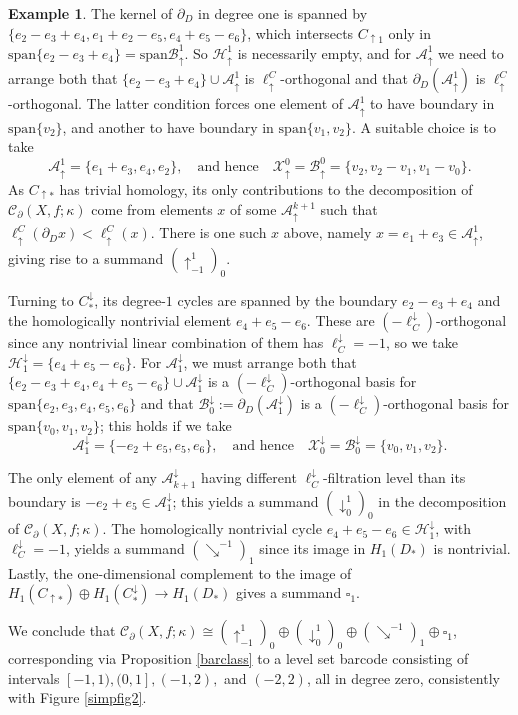 \documentclass[11pt]{amsart}
\theoremstyle{definition}
\newtheorem{ex}[theorem]{Example}
\theoremstyle{remark}
\numberwithin{equation}{section}
\begin{document}
\begin{ex}
	The kernel of $\partial_D$ in degree one is spanned by $\{e_2-e_3+e_4,e_1+e_2-e_5, e_4+e_5-e_6\}$, which intersects $C_{\uparrow 1}$ only in $\mathrm{span}\{e_2-e_3+e_4\}=\mathrm{span}\mathcal{B}_{\uparrow}^{1}$.  So $\mathcal{H}_{\uparrow}^{1}$ is necessarily empty, and for $\mathcal{A}_{\uparrow}^{1}$ we need to arrange both that $\{e_2-e_3+e_4\}\cup \mathcal{A}_{\uparrow}^{1}$ is $\ell_{\uparrow}^{C}$-orthogonal and that $\partial_D(\mathcal{A}_{\uparrow}^{1})$ is  $\ell_{\uparrow}^{C}$-orthogonal.  The latter condition forces one element of $\mathcal{A}_{\uparrow}^{1}$ to have boundary in $\mathrm{span}\{v_2\}$, and another to have boundary in $\mathrm{span}\{v_1,v_2\}$.  A suitable choice is to take \[ \mathcal{A}_{\uparrow}^{1}=\{e_1+e_3,e_4,e_2\},\quad\mbox{and hence}\quad \mathcal{X}_{\uparrow}^{0}=\mathcal{B}_{\uparrow}^{0}=\{v_2,v_2-v_1,v_1-v_0\}.\]	As $C_{\uparrow *}$ has trivial homology, its only contributions to the decomposition of $\mathcal{C}_{\partial}(X,f;\kappa)$ come from elements $x$ of some $\mathcal{A}_{\uparrow}^{k+1}$ such that $\ell_{\uparrow}^{C}(\partial_Dx)<\ell_{\uparrow}^{C}(x)$.  There is one such $x$ above, namely $x=e_1+e_3\in \mathcal{A}_{\uparrow}^{1}$, giving rise to a summand $(\uparrow_{-1}^{1})_0$.
	
	Turning to $C^{\downarrow}_{*}$, its degree-$1$ cycles are spanned by the boundary $e_2-e_3+e_4$ and the homologically nontrivial element $e_4+e_5-e_6$. These are $(-\ell^{\downarrow}_C)$-orthogonal since any nontrivial linear combination of them has $\ell^{\downarrow}_{C}=-1$, so we take $\mathcal{H}^{\downarrow}_{1}=\{e_4+e_5-e_6\}$. For $\mathcal{A}^{\downarrow}_{1}$, we must arrange both that $\{e_2-e_3+e_4,e_4+e_5-e_6\}\cup\mathcal{A}^{\downarrow}_{1}$ is a $(-\ell^{\downarrow}_C)$-orthogonal basis for $\mathrm{span}\{e_2,e_3,e_4,e_5,e_6\}$ and that $\mathcal{B}^{\downarrow}_{0}:=\partial_D(\mathcal{A}^{\downarrow}_{1})$ is a
	 $(-\ell^{\downarrow}_C)$-orthogonal basis for $\mathrm{span}\{v_0,v_1,v_2\}$; this holds if we take \[ \mathcal{A}^{\downarrow}_{1}=\{-e_2+e_5,e_5,e_6\},\quad\mbox{and hence}\quad \mathcal{X}^{\downarrow}_{0}=\mathcal{B}^{\downarrow}_{0}=\{v_0,v_1,v_2\}.\]

The only element of any $\mathcal{A}^{\downarrow}_{k+1}$ having different $\ell_{C}^{\downarrow}$-filtration level than its boundary is $-e_2+e_5\in\mathcal{A}^{\downarrow}_{1}$; this yields a summand $(\downarrow^{1}_{0})_0$ in the decomposition of $\mathcal{C}_{\partial}(X,f;\kappa)$.  The homologically nontrivial cycle $e_4+e_5-e_6\in \mathcal{H}_{1}^{\downarrow}$, with $\ell^{\downarrow}_{C}=-1$, yields a summand $(\searrow^{-1})_1$ since its image in $H_1(D_*)$ is nontrivial.  Lastly, the one-dimensional complement to the image of $H_1(C_{\uparrow*})\oplus H_1(C^{\downarrow}_{*})\to H_1(D_*)$ gives a summand $\square_1$.

We conclude that $\mathcal{C}_{\partial}(X,f;\kappa)\cong 
(\uparrow_{-1}^{1})_0\oplus (\downarrow^{1}_{0})_0\oplus (\searrow^{-1})_1\oplus \square_1$, corresponding via Proposition \ref{barclass} to a level set barcode consisting of intervals $[-1,1),(0,1],(-1,2),$ and $(-2,2)$, all in degree zero, consistently with Figure \ref{simpfig2}.
\end{ex}
\end{document}
